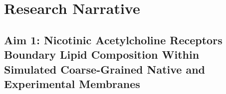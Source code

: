 \documentclass[9pt]{extarticle} %
\begin{document}

\section*{Research Narrative}





\subsection*{\textbf{Aim 1}: Nicotinic Acetylcholine Receptors Boundary Lipid Composition Within Simulated Coarse-Grained Native and Experimental Membranes}
\end{document}
